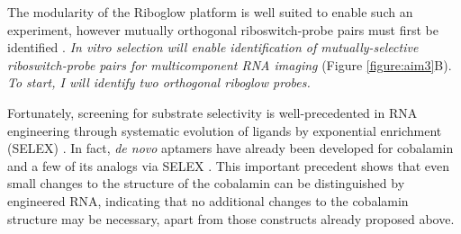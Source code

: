 The modularity of the Riboglow platform is well suited to enable such an experiment, however mutually orthogonal riboswitch-probe pairs must first be identified . \textit{In vitro selection will enable identification of mutually-selective riboswitch-probe pairs for multicomponent RNA imaging} (Figure \ref{figure:aim3}B). \textit{To start, I will identify two orthogonal riboglow probes.}

Fortunately, screening for substrate selectivity is well-precedented in RNA engineering through systematic evolution of ligands by exponential enrichment (SELEX) \cite{MairalAptamersmoleculartools2008,ChoApplicationsAptamersSensors2009}.
In fact, \textit{de novo} aptamers have already been developed for cobalamin and a few of its analogs via SELEX \cite{LorschvitroselectionRNA1994}. This important precedent shows that even small changes to the structure of the cobalamin can be distinguished by engineered RNA, indicating that no additional changes to the cobalamin structure may be necessary, apart from those constructs already proposed above.

